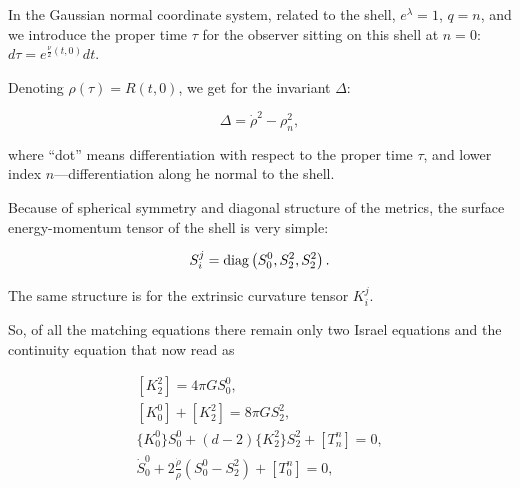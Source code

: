 In the Gaussian normal coordinate system, related to the shell, $e^{\lambda} = 1$, ${q = n}$, and we introduce the proper time $\tau$ for the observer sitting on this shell at ${n = 0}:$ $ d \tau = e^{\frac{\nu}{2}(t, 0)} dt$. 

Denoting $\rho(\tau) = R(t, 0)$, we get for the invariant $\Delta$:

\begin{equation}

\label{deltan}

\Delta = \dot \rho ^2 - \rho ^2_n ,

\end{equation}

where ``dot'' means differentiation with respect to the proper time $\tau$, and lower index $n$---differentiation along he normal to the shell. 

Because of spherical symmetry and diagonal structure of the metrics, the surface energy-momentum tensor of the shell is very simple:

\begin{equation}

\label{sdiag}

S^j_i = \mathop{\rm diag} \left(S^0_0, S^2_2, S^2_2 \right) .

\end{equation}

The same structure is for the extrinsic curvature tensor $K^j_i$. 

So, of all the matching equations there remain only two Israel equations and the continuity equation that now read as

\begin{gather}

\label{ssEoM0}

[K_2^2] = 4\pi G S_0^0,

\\

\label{ssEoM1}

[K_0^0] + [K_2^2] = 8\pi G S_2^2,

\\

\label{ssEoC}

\{K_0^0\}S_0^0+(d-2)\{K_2^2\}S_2^2+[T_n^n]=0,

\\

\label{ssEoC1}

\dot S_0^0 + 2 \frac{\dot \rho}{\rho}(S_0^0-S_2^2) + [T_0^n]=0,

\end{gather}

